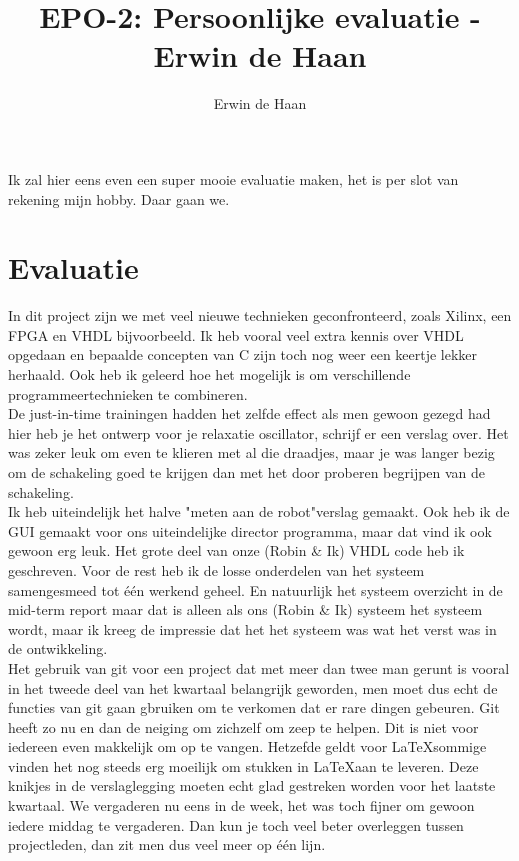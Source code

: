 \documentclass{article}
\title{EPO-2: Persoonlijke evaluatie - Erwin de Haan}
\author{Erwin de Haan}
\begin{document}
\maketitle
Ik zal hier eens even een super mooie evaluatie maken, het is per slot van rekening mijn hobby. Daar gaan we.
\section*{Evaluatie}
In dit project zijn we met veel nieuwe technieken geconfronteerd, zoals Xilinx, een FPGA en VHDL bijvoorbeeld. Ik heb vooral veel extra kennis over VHDL opgedaan en bepaalde concepten van C zijn toch nog weer een keertje lekker herhaald. Ook heb ik geleerd hoe het mogelijk is om verschillende programmeertechnieken te combineren.\\

\noindent
De just-in-time trainingen hadden het zelfde effect als men gewoon gezegd had hier heb je het ontwerp voor je relaxatie oscillator, schrijf er een verslag over. Het was zeker leuk om even te klieren met al die draadjes, maar je was langer bezig om de schakeling goed te krijgen dan met het door proberen begrijpen van de schakeling.\\

\noindent
Ik heb uiteindelijk het halve "meten aan de robot"\:verslag gemaakt. Ook heb ik de GUI gemaakt voor ons uiteindelijke director programma, maar dat vind ik ook gewoon erg leuk. Het grote deel van onze (Robin \& Ik) VHDL code heb ik geschreven. Voor de rest heb ik de losse onderdelen van het systeem samengesmeed tot één werkend geheel. En natuurlijk het systeem overzicht in de mid-term report maar dat is alleen als ons (Robin \& Ik) systeem het systeem wordt, maar ik kreeg de impressie dat het het systeem was wat het verst was in de ontwikkeling.\\

\noindent
Het gebruik van git voor een project dat met meer dan twee man gerunt is vooral in het tweede deel van het kwartaal belangrijk geworden, men moet dus echt de functies van git gaan gbruiken om te verkomen dat er rare dingen gebeuren. Git heeft zo nu en dan de neiging om zichzelf om zeep te helpen. Dit is niet voor iedereen even makkelijk om op te vangen. Hetzefde geldt voor \LaTeX\:sommige vinden het nog steeds erg moeilijk om stukken in \LaTeX\:aan te leveren. Deze knikjes in de verslaglegging moeten echt glad gestreken worden voor het laatste kwartaal. We vergaderen nu eens in de week, het was toch fijner om gewoon iedere middag te vergaderen. Dan kun je toch veel beter overleggen tussen projectleden, dan zit men dus veel meer op één lijn.\\
\end{document}
